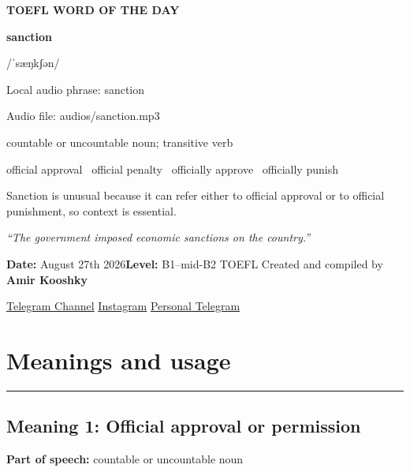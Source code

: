 \documentclass[11pt]{article}
\newcommand{\sectionrule}{\par\vspace{-0.5em}\noindent\textcolor{Accent}{\rule{\linewidth}{0.6pt}}\par}
\begin{document}
\begin{center}
{\sffamily\bfseries\color{Accent} TOEFL WORD OF THE DAY\par}
\vspace{8mm}
{\fontsize{42}{48}\selectfont\bfseries sanction\par}
\vspace{2mm}
{\Large\sffamily\color{Accent} /ˈsæŋkʃən/\par}
\vspace{2mm}
{\small\sffamily Local audio phrase: sanction\par}
{\small\sffamily Audio file: audios/sanction.mp3\par}
\vspace{2mm}
{\large\sffamily\color{Muted} countable or uncountable noun; transitive verb\par}
\vspace{5mm}
{\sffamily official approval \textbullet\ official penalty \textbullet\ officially approve \textbullet\ officially punish\par}
\vspace{6mm}
{\large Sanction is unusual because it can refer either to official approval or to official punishment, so context is essential.\par}
\vspace{6mm}
\begin{minipage}{0.84\textwidth}
\itshape “The government imposed economic sanctions on the country.”
\end{minipage}\par
\vspace{10mm}
\textbf{Date:} August 27th 2026\quad\textbullet\quad \textbf{Level:} B1--mid-B2 TOEFL
\vfill
Created and compiled by \textbf{Amir Kooshky}\par
\vspace{2mm}
\href{https://t.me/KooshkyTOEFL}{Telegram Channel}\quad\textbullet\quad
\href{https://www.instagram.com/kooshkytoefl}{Instagram}\quad\textbullet\quad
\href{https://t.me/KooshkyTOEFL\_pv}{Personal Telegram}
\end{center}
\newpage
\tableofcontents
\newpage

\section{Meanings and usage}
\sectionrule
\subsection{Meaning 1: Official approval or permission}
\textbf{Part of speech:} countable or uncountable noun
\end{document}
